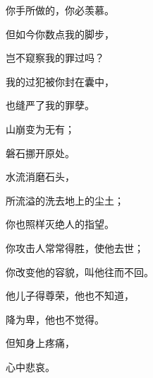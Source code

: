 {\par }{\Q 你手所做的，你必羡慕。
\par }{\Q {}但如今你数点我的脚步，
\par }{\Q 岂不窥察我的罪过吗？
\par }{\Q {}我的过犯被你封在囊中，
\par }{\Q 也缝严了我的罪孽。
\par }{\BB \par }{\Q {}山崩变为无有；
\par }{\Q 磐石挪开原处。
\par }{\Q {}水流消磨石头，
\par }{\Q 所流溢的洗去地上的尘土；
\par }{\Q 你也照样灭绝人的指望。
\par }{\Q {}你攻击人常常得胜，使他去世；
\par }{\Q 你改变他的容貌，叫他往而不回。
\par }{\Q {}他儿子得尊荣，他也不知道，
\par }{\Q 降为卑，他也不觉得。
\par }{\Q {}但知身上疼痛，
\par }{\Q 心中悲哀。

}

